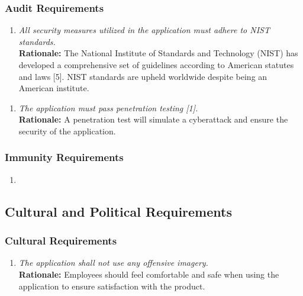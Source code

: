 \documentclass[]{article}
\begin{document}
\begin{enumerate}[{\bf BE1.}]
\subsubsection{Audit Requirements}
\label{ssub:audit_requirements}
\begin{enumerate}[{SR-AU}1. ]
    \item \emph{All security measures utilized in the application must adhere to NIST standards.}\\
    {\bf Rationale:} The National Institute of Standards and Technology (NIST) has developed a comprehensive set of guidelines according to American statutes and laws [5]. NIST standards are upheld worldwide despite being an American institute.
\end{enumerate}
\begin{enumerate}[{SR-AU}2. ]
    \item \emph{The application must pass penetration testing [1]. }\\
    {\bf Rationale:} A penetration test will simulate a cyberattack and ensure the security of the application.
\end{enumerate}


\subsubsection{Immunity Requirements}
\label{ssub:immunity_requirements}
\begin{enumerate}[{N/A}]
    \item
\end{enumerate}




\subsection{Cultural and Political Requirements}
\label{sub:cultural_and_political_requirements}


\subsubsection{Cultural Requirements}
\label{ssub:cultural_requirements}
\begin{enumerate}[{CP-C}1. ]
    \item \emph{The application shall not use any offensive imagery.}\\
    {\bf Rationale:} Employees should feel comfortable and safe when using the application to ensure satisfaction with the product.
\end{enumerate}



\end{enumerate}
\end{document}
